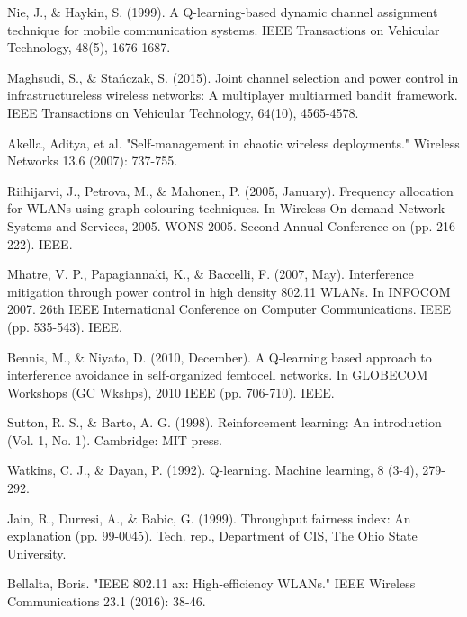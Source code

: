 \documentclass[conference]{IEEEtran}
\begin{document}
	\begin{thebibliography}{20}
		
		 Nie, J., \& Haykin, S. (1999). A Q-learning-based dynamic channel assignment technique for mobile communication systems. IEEE Transactions on Vehicular Technology, 48(5), 1676-1687.
		
		 Maghsudi, S., \& Stańczak, S. (2015). Joint channel selection and power control in infrastructureless wireless networks: A multiplayer multiarmed bandit framework. IEEE Transactions on Vehicular Technology, 64(10), 4565-4578.
		
		 Akella, Aditya, et al. "Self-management in chaotic wireless deployments." Wireless Networks 13.6 (2007): 737-755.
		
		 Riihijarvi, J., Petrova, M., \& Mahonen, P. (2005, January). Frequency allocation for WLANs using graph colouring techniques. In Wireless On-demand Network Systems and Services, 2005. WONS 2005. Second Annual Conference on (pp. 216-222). IEEE.
		
		 Mhatre, V. P., Papagiannaki, K., \& Baccelli, F. (2007, May). Interference mitigation through power control in high density 802.11 WLANs. In INFOCOM 2007. 26th IEEE International Conference on Computer Communications. IEEE (pp. 535-543). IEEE.
		
		 Bennis, M., \& Niyato, D. (2010, December). A Q-learning based approach to interference avoidance in self-organized femtocell networks. In GLOBECOM Workshops (GC Wkshps), 2010 IEEE (pp. 706-710). IEEE.
		
		 Sutton, R. S., \& Barto, A. G. (1998). Reinforcement learning: An introduction (Vol. 1, No. 1). Cambridge: MIT press.
		
		 Watkins, C. J., \& Dayan, P. (1992). Q-learning. Machine learning, 8 (3-4), 279-292.
		
		 Jain, R., Durresi, A., \& Babic, G. (1999). Throughput fairness index: An explanation (pp. 99-0045). Tech. rep., Department of CIS, The Ohio State University.
		
		 Bellalta, Boris. "IEEE 802.11 ax: High-efficiency WLANs." IEEE Wireless Communications 23.1 (2016): 38-46.  
		
	\end{thebibliography}	
	
\end{document}
